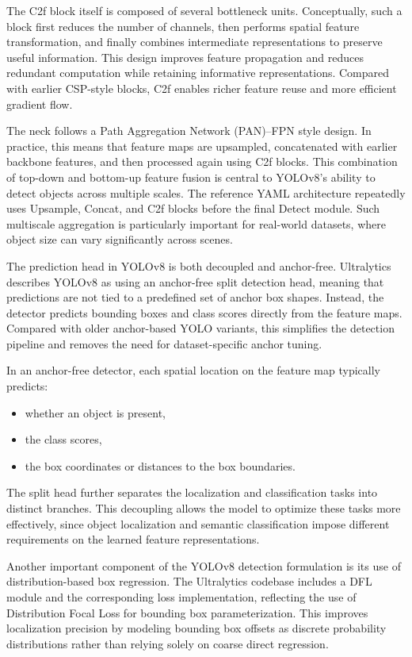 \documentclass[12pt,a4paper]{report}
\begin{document}
The C2f block itself is composed of several bottleneck units. Conceptually, such a block first reduces the number
of channels, then performs spatial feature transformation, and finally combines intermediate representations
to preserve useful information. This design improves feature propagation and reduces redundant computation while
retaining informative representations. Compared with earlier CSP-style blocks, C2f enables richer feature reuse
and more efficient gradient flow.

The neck follows a Path Aggregation Network (PAN)--FPN style design. In practice, this means that feature maps are upsampled, concatenated
with earlier backbone features, and then processed again using C2f blocks. This combination of top-down and bottom-up
feature fusion is central to YOLOv8's ability to detect objects across multiple scales. The reference YAML
architecture repeatedly uses Upsample, Concat, and C2f blocks before the final
Detect module. Such multiscale aggregation is particularly important for real-world datasets, where
object size can vary significantly across scenes.

The prediction head in YOLOv8 is both decoupled and anchor-free. Ultralytics describes YOLOv8 as using an anchor-free
split detection head, meaning that predictions are not tied to a predefined set of anchor box shapes. Instead,
the detector predicts bounding boxes and class scores directly from the feature maps. Compared with older anchor-based
YOLO variants, this simplifies the detection pipeline and removes the need for dataset-specific anchor tuning.

In an anchor-free detector, each spatial location on the feature map typically predicts:
\begin{itemize}
    \item whether an object is present,
    \item the class scores,
    \item the box coordinates or distances to the box boundaries.
\end{itemize}

The split head further separates the localization and classification tasks into distinct branches. This decoupling
allows the model to optimize these tasks more effectively, since object localization and semantic classification
impose different requirements on the learned feature representations.

Another important component of the YOLOv8 detection formulation is its use of distribution-based box regression.
The Ultralytics codebase includes a DFL module and the corresponding loss implementation, reflecting the use
of Distribution Focal Loss for bounding box parameterization. This improves localization precision by modeling
bounding box offsets as discrete probability distributions rather than relying solely on coarse direct regression.
\end{document}
